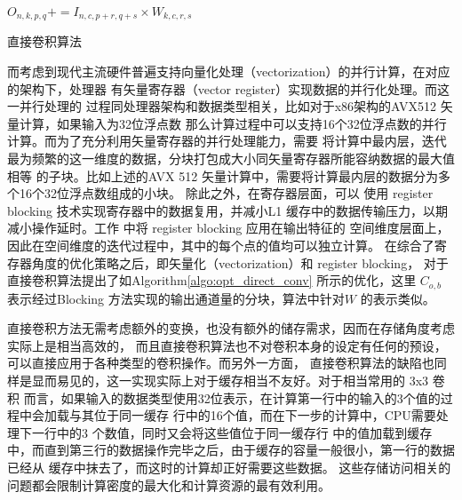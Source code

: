 \begin{algorithm}
  \begin{algorithmic}
                  \State $O_{n,k,p,q} += I_{n,c,p+r,q+s} \times W_{k,c,r,s}$
              \EndFor
            \EndFor
          \EndFor
        \EndFor
      \EndFor
    \EndFor
  \end{algorithmic}
  \caption{直接卷积算法}
  \label{algo:direct-conv}
\end{algorithm}

而考虑到现代主流硬件普遍支持向量化处理（vectorization）的并行计算，在对应的架构下，处理器
有矢量寄存器（vector register）实现数据的并行化处理。而这一并行处理的
过程同处理器架构和数据类型相关，比如对于x86架构的AVX512 矢量计算，如果输入为32位浮点数
那么计算过程中可以支持16个32位浮点数的并行计算。而为了充分利用矢量寄存器的并行处理能力，需要
将计算中最内层，迭代最为频繁的这一维度的数据，分块打包成大小同矢量寄存器所能容纳数据的最大值相等
的子块。比如上述的AVX 512 矢量计算中，需要将计算最内层的数据分为多个16个32位浮点数组成的小块。
除此之外，在寄存器层面，可以
使用 register blocking 技术实现寄存器中的数据复用，并减小L1 缓存中的数据传输压力，以期
减小操作延时。工作\cite{Georganas2018AnatomyOH} 中将 register blocking 应用在输出特征的
空间维度层面上，因此在空间维度的迭代过程中，其中的每个点的值均可以独立计算。
在综合了寄存器角度的优化策略之后，即矢量化（vectorization）和 register blocking，
\cite{Georganas2018AnatomyOH} 对于直接卷积算法提出了如Algorithm\ref{algo:opt_direct_conv}
所示的优化，这里 $C_{o,b}$ 表示经过Blocking 方法实现的输出通道量的分块，算法中针对$W$ 的表示类似。


直接卷积方法无需考虑额外的变换，也没有额外的储存需求，因而在存储角度考虑实际上是相当高效的，
而且直接卷积算法也不对卷积本身的设定有任何的预设，可以直接应用于各种类型的卷积操作。而另外一方面，
直接卷积算法的缺陷也同样是显而易见的，这一实现实际上对于缓存相当不友好。对于相当常用的 3x3 卷积
而言，如果输入的数据类型使用32位表示，在计算第一行中的输入的3个值的过程中会加载与其位于同一缓存
行中的16个值，而在下一步的计算中，CPU需要处理下一行中的3 个数值，同时又会将这些值位于同一缓存行
中的值加载到缓存中，而直到第三行的数据操作完毕之后，由于缓存的容量一般很小，第一行的数据已经从
缓存中抹去了，而这时的计算却正好需要这些数据。 这些存储访问相关的问题都会限制计算密度的最大化和计算资源的最有效利用。

